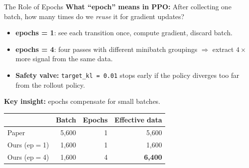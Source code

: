 \documentclass[aspectratio=169,11pt]{beamer}
\begin{document}
\begin{frame}{The Role of Epochs}
  \small
  \textbf{What ``epoch'' means in PPO:}
  After collecting one batch, how many times do we \emph{reuse} it for gradient updates?

  \medskip
  \begin{center}
  \end{center}

  \begin{itemize}\setlength\itemsep{1pt}
    \item \textbf{epochs = 1}: see each transition once, compute gradient, discard batch.
    \item \textbf{epochs = 4}: four passes with different minibatch groupings
      $\Rightarrow$ extract $4\times$ more signal from the same data.
    \item \textbf{Safety valve:} \texttt{target\_kl = 0.01} stops early
      if the policy diverges too far from the rollout policy.
  \end{itemize}

  \smallskip
  \textbf{Key insight:} epochs compensate for small batches.
  \begin{center}
  \footnotesize
  \begin{tabular}{lrrr}
    \toprule
    & \textbf{Batch} & \textbf{Epochs} & \textbf{Effective data} \\
    \midrule
    Paper          & 5{,}600 & 1 & 5{,}600 \\
    Ours (ep$=$1)  & 1{,}600 & 1 & 1{,}600 \\
    \rowcolor{highlight}
    Ours (ep$=$4)  & 1{,}600 & 4 & \textbf{6{,}400} \\
    \bottomrule
  \end{tabular}
  \end{center}
\end{frame}
\end{document}
